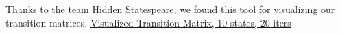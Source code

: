 Thanks to the team Hidden Statespeare, we found this tool for visualizing our transition matrices.
\href{http://setosa.io/markov/index.html#%7B%22tm%22%3A%5B%5B0.14911780701621213%2C0.00010572295755836036%2C0.016198406555885045%2C0.0016568860217401576%2C0.04232650579942076%2C0.000560883741495299%2C0.00023999264017775384%2C0.1203754239165369%2C0.0026129355973558504%2C0.6668054357536208%5D%2C%5B0.000437708826413381%2C0.028375420362495806%2C0.0023637788632358127%2C0.13011855858214588%2C0.018582583431150906%2C0.0022389705666316685%2C0.5318743969327084%2C0.032805978633223716%2C0.0000010931256096617502%2C0.2532015106763805%5D%2C%5B0.00006041324386681654%2C0.5654530204127515%2C0.0025598667500555416%2C0.003034649977868434%2C0.021699996415127824%2C0.0000027974488129123203%2C0.003539809124666394%2C0.40339013133636925%2C0.000014370033986913576%2C0.0002449452564950452%5D%2C%5B0.0018612760388129707%2C0.002037433477895126%2C0.5052102015485214%2C0.0012349449664440482%2C0.0028678277403334836%2C0.000008450824570543032%2C0.3669248947703795%2C0.09427276112942308%2C0.00006631798695654071%2C0.02551589151666174%5D%2C%5B0.000005296614577609269%2C0.0039100305364940125%2C0.022683952820654094%2C0.3289977811068986%2C0.06501344300024292%2C0.000016616851749767245%2C0.0068482321246508574%2C0.06255119450146387%2C0.00007901197443834435%2C0.5098944404688287%5D%2C%5B0.06596993404458429%2C0.0028920358275504533%2C0.04987788005753903%2C0.00011843324358164615%2C0.2533237364632281%2C0.017261484443527722%2C0.005753403952515774%2C0.012414018050341188%2C0.5893715650158543%2C0.003017508901265842%5D%2C%5B0.00038578516655109207%2C0.0006775888632618098%2C0.026116244137306847%2C0.5252840113309079%2C0.31873519580796067%2C0.011736130070108557%2C0.00007430669906052717%2C0.019957117544793346%2C0.0007742733241273738%2C0.09625934705591993%5D%2C%5B0.3956861993382268%2C0.00003880756861684995%2C0.0008000081361946689%2C0.003816403036142031%2C0.0008442854864070178%2C0.5496426596086107%2C0.01738939300221058%2C0.0008627634984346483%2C0.029493962881793668%2C0.0014255174433633496%5D%2C%5B0.002212186572691488%2C0.0008943320348949857%2C0.3183029705397009%2C0.0008140179500970441%2C0.35557447192893055%2C0.003038969213980188%2C0.019511172115105467%2C0.24091563755598489%2C0.05035203572619779%2C0.008384206362414054%5D%2C%5B0.000017504689502350425%2C0.9194083664937497%2C0.00000270196418012294%2C0.002259737911401638%2C0.0020669584746729297%2C2.8227225867623864e-7%2C0.05954567015206327%2C0.011839395679871969%2C3.4925508750036434e-7%2C0.004859033107211286%5D%5D%7D}{Visualized Transition Matrix, 10 states, 20 iters}

